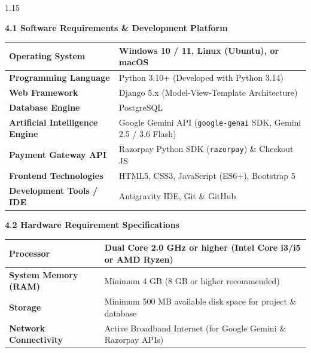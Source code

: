 \documentclass[12pt,a4paper]{article}
\begin{document}
{\fontsize{13}{18}\selectfont
\begin{spacing}{1.15}

\noindent
\textbf{4.1 Software Requirements \& Development Platform}

\vspace{0.06in}

\begin{center}
\renewcommand{\arraystretch}{1.2}
\fontsize{11.5}{15}\selectfont
\begin{tabular}{|p{2.1in}|p{4.4in}|}
\hline
\textbf{Operating System} & Windows 10 / 11, Linux (Ubuntu), or macOS \\ \hline
\textbf{Programming Language} & Python 3.10+ (Developed with Python 3.14) \\ \hline
\textbf{Web Framework} & Django 5.x (Model-View-Template Architecture) \\ \hline
\textbf{Database Engine} & PostgreSQL \\ \hline
\textbf{Artificial Intelligence Engine} & Google Gemini API (\texttt{google-genai} SDK, Gemini 2.5 / 3.6 Flash) \\ \hline
\textbf{Payment Gateway API} & Razorpay Python SDK (\texttt{razorpay}) \& Checkout JS \\ \hline
\textbf{Frontend Technologies} & HTML5, CSS3, JavaScript (ES6+), Bootstrap 5 \\ \hline
\textbf{Development Tools / IDE} & Antigravity IDE, Git \& GitHub \\ \hline
\end{tabular}
\end{center}

\vspace{0.12in}

\noindent
\textbf{4.2 Hardware Requirement Specifications}

\vspace{0.06in}

\begin{center}
\renewcommand{\arraystretch}{1.2}
\fontsize{11.5}{15}\selectfont
\begin{tabular}{|p{2.1in}|p{4.4in}|}
\hline
\textbf{Processor} & Dual Core 2.0 GHz or higher (Intel Core i3/i5 or AMD Ryzen) \\ \hline
\textbf{System Memory (RAM)} & Minimum 4 GB (8 GB or higher recommended) \\ \hline
\textbf{Storage} & Minimum 500 MB available disk space for project \& database \\ \hline
\textbf{Network Connectivity} & Active Broadband Internet (for Google Gemini \& Razorpay APIs) \\ \hline
\end{tabular}
\end{center}

\end{spacing}
}
\end{document}
